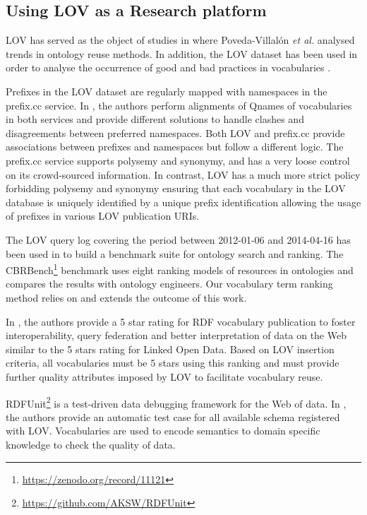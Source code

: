 \documentclass{iosart2c}
\begin{document}
\subsection{Using LOV as a Research platform}

LOV has served as the object of studies in \cite{poveda2012landscape} where Poveda-Villal\'on \emph{et al.} analysed trends in ontology reuse methods. In addition, the LOV dataset has been used in order to analyse the occurrence of good and bad practices in vocabularies \cite{poveda2013detecting}.

Prefixes in the LOV dataset are regularly mapped with namespaces in the prefix.cc service. In \cite{wasabi13}, the authors perform alignments of Qnames of vocabularies in both services and provide different solutions to handle clashes and disagreements between preferred namespaces. Both  LOV and prefix.cc provide associations between prefixes and namespaces but follow a different logic. The prefix.cc service supports polysemy and synonymy, and has a very loose control on its crowd-sourced information. In contrast, LOV has a much more strict policy forbidding polysemy and synonymy ensuring that each vocabulary in the LOV database is uniquely identified by a unique prefix identification allowing the usage of prefixes in various LOV publication URIs. 

The LOV query log covering the period between 2012-01-06 and 2014-04-16 has been used in \cite{butt2014} to build a benchmark suite for ontology search and ranking. The CBRBench\footnote{\url{https://zenodo.org/record/11121}} benchmark uses eight ranking models of resources in ontologies and compares the results with ontology engineers. Our vocabulary term ranking method relies on and extends the outcome of this work.

In \cite{janowicz2014five}, the authors provide a 5 star rating for RDF vocabulary publication to foster interoperability, query federation and better interpretation of data on the Web similar to the 5 stars rating for Linked Open Data. Based on LOV insertion criteria, all vocabularies must be 5 stars using this ranking and must provide further quality attributes imposed by LOV to facilitate vocabulary reuse.


RDFUnit\footnote{\url{https://github.com/AKSW/RDFUnit}} is a test-driven data debugging framework for the Web of data. In \cite{rdfunit}, the authors provide an automatic test case for all available schema registered with LOV. Vocabularies are used to encode semantics to domain specific knowledge to check the quality of data.
\end{document}
